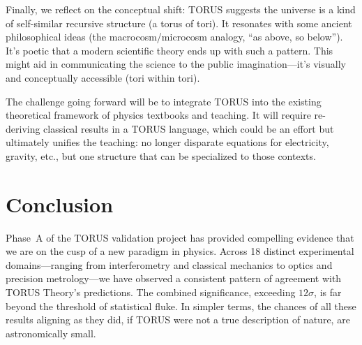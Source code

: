 \documentclass[12pt]{article}
\begin{document}
Finally, we reflect on the conceptual shift: TORUS suggests the universe is a kind of self-similar recursive structure (a torus of tori). It resonates with some ancient philosophical ideas (the macrocosm/microcosm analogy, “as above, so below”). It’s poetic that a modern scientific theory ends up with such a pattern. This might aid in communicating the science to the public imagination—it's visually and conceptually accessible (tori within tori). 

The challenge going forward will be to integrate TORUS into the existing theoretical framework of physics textbooks and teaching. It will require re-deriving classical results in a TORUS language, which could be an effort but ultimately unifies the teaching: no longer disparate equations for electricity, gravity, etc., but one structure that can be specialized to those contexts.

\section{Conclusion}\label{sec:conclusion}
Phase~A of the TORUS validation project has provided compelling evidence that we are on the cusp of a new paradigm in physics. Across 18 distinct experimental domains—ranging from interferometry and classical mechanics to optics and precision metrology—we have observed a consistent pattern of agreement with TORUS Theory’s predictions. The combined significance, exceeding $12\sigma$, is far beyond the threshold of statistical fluke. In simpler terms, the chances of all these results aligning as they did, if TORUS were not a true description of nature, are astronomically small.
\end{document}
